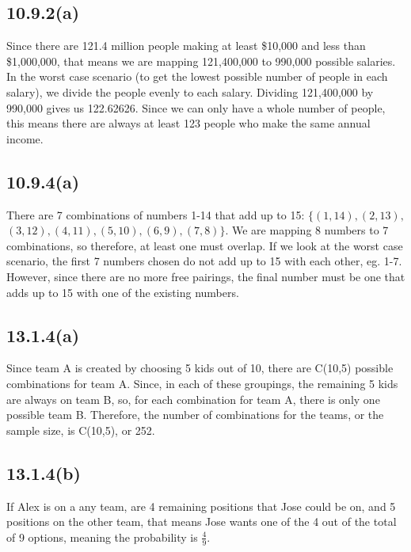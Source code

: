 \documentclass{article}
\begin{document}
\subsection*{10.9.2(a)}
Since there are 121.4 million people making at least \$10,000 and less than \$1,000,000, that means we are mapping 121,400,000 to 990,000 possible salaries. In the worst case scenario (to get the lowest possible number of people in each salary), we divide the people evenly to each salary. Dividing 121,400,000 by 990,000 gives us 122.62626. Since we can only have a whole number of people, this means there are always at least 123 people who make the same annual income.
\subsection*{10.9.4(a)}
There are 7 combinations of numbers 1-14 that add up to 15: $\{(1,14),(2,13),$ $(3,12),(4,11),(5,10),(6,9),(7,8)\}$. We are mapping 8 numbers to 7 combinations, so therefore, at least one must overlap. If we look at the worst case scenario, the first 7 numbers chosen do not add up to 15 with each other, eg. 1-7. However, since there are no more free pairings, the final number must be one that adds up to 15 with one of the existing numbers.
\subsection*{13.1.4(a)}
Since team A is created by choosing 5 kids out of 10, there are C(10,5) possible combinations for team A. Since, in each of these groupings, the remaining 5 kids are always on team B, so, for each combination for team A, there is only one possible team B. Therefore, the number of combinations for the teams, or the sample size, is C(10,5), or 252.
\subsection*{13.1.4(b)}
If Alex is on a any team, are 4 remaining positions that Jose could be on, and 5 positions on the other team, that means Jose wants one of the 4 out of the total of 9 options, meaning the probability is $\frac{4}{9}$.
\clearpage
\end{document}
